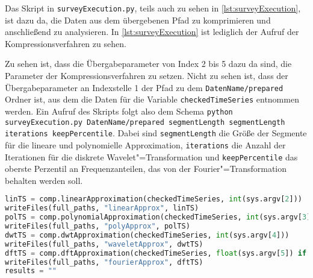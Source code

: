 Das Skript in \texttt{surveyExecution.py}, teils auch zu sehen in \autoref{lst:surveyExecution}, ist dazu da, die Daten aus dem übergebenen Pfad zu komprimieren und anschließend zu analysieren. In \autoref{lst:surveyExecution} ist lediglich der Aufruf der Kompressionsverfahren zu sehen. 

Zu sehen ist, dass die Übergabeparameter von Index 2 bis 5 dazu da sind, die Parameter der Kompressionsverfahren zu setzen. Nicht zu sehen ist, dass der Übergabeparameter an Indexstelle 1 der Pfad zu dem \texttt{DatenName/prepared} Ordner ist, aus dem die Daten für die Variable \lstinline|checkedTimeSeries| entnommen werden. Ein Aufruf des Skripts folgt also dem Schema \lstinline|python surveyExecution.py DatenName/prepared segmentLength segmentLength iterations keepPercentile|. Dabei sind \lstinline|segmentLength| die Größe der Segmente für die lineare und polynomielle Approximation, \lstinline|iterations| die Anzahl der Iterationen für die diskrete Wavelet"=Transformation und \lstinline|keepPercentile| das oberste Perzentil an Frequenzanteilen, das von der Fourier"=Transformation behalten werden soll.
\begin{lstlisting}[caption=Skript zur Ausführung des Experiments, language=Python, label=lst:surveyExecution, style=Python]
linTS = comp.linearApproximation(checkedTimeSeries, int(sys.argv[2]))
writeFiles(full_paths, "linearApprox", linTS)
polTS = comp.polynomialApproximation(checkedTimeSeries, int(sys.argv[3]))
writeFiles(full_paths, "polyApprox", polTS)
dwtTS = comp.dwtApproximation(checkedTimeSeries, int(sys.argv[4]))
writeFiles(full_paths, "waveletApprox", dwtTS)
dftTS = comp.dftApproximation(checkedTimeSeries, float(sys.argv[5]) if len(sys.argv) == 6 else 10)
writeFiles(full_paths, "fourierApprox", dftTS)
results = ""
\end{lstlisting}